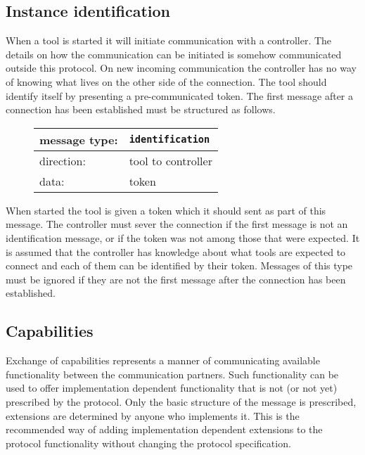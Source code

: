 \documentclass{article}
\newcommand{\msg}[1]{\texttt{#1}}
\begin{document}
  \subsection{Instance identification} \label{s:instance_identification}

   When a tool is started it will initiate communication with a controller.
   The details on how the communication can be initiated is somehow
   communicated outside this protocol. On new incoming communication the
   controller has no way of knowing what lives on the other side of the
   connection. The tool should identify itself by presenting a pre-communicated
   token. The first message after a connection has been established must be
   structured as follows.
   
   \begin{figure}[H]
    \begin{center}
     \begin{tabular}{|ll|}
      \hline
      message type:    & \msg{identification} \\
      \hline
      direction:       & tool to controller \\
      data:            & token \\
      \hline
     \end{tabular}
    \end{center}
   \end{figure}

   \noindent When started the tool is given a token which it should sent as
   part of this message. The controller must sever the connection if the first
   message is not an identification message, or if the token was not among
   those that were expected. It is assumed that the controller has knowledge
   about what tools are expected to connect and each of them can be identified
   by their token.  Messages of this type must be ignored if they are not the
   first message after the connection has been established.

  \subsection{Capabilities}

   Exchange of capabilities represents a manner of communicating available
   functionality between the communication partners.  Such functionality can be
   used to offer implementation dependent functionality that is not (or not
   yet) prescribed by the protocol. Only the basic structure of the message is
   prescribed, extensions are determined by anyone who implements it. This is the
   recommended way of adding implementation dependent extensions to the
   protocol functionality without changing the protocol specification.
\end{document}
